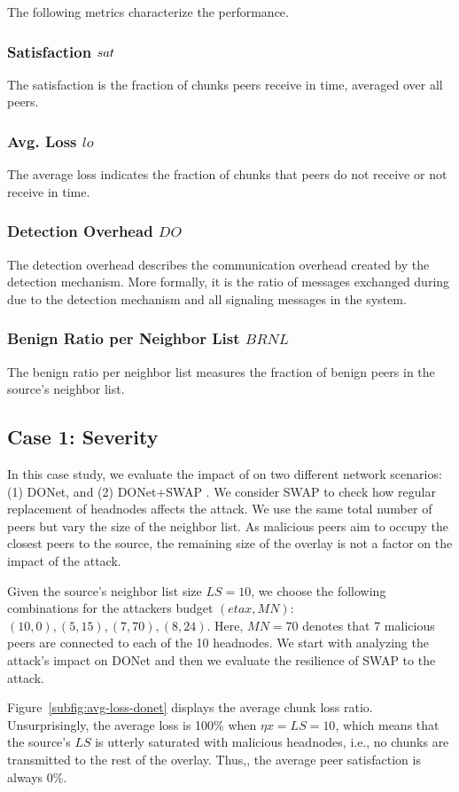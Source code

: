 The following metrics characterize the performance.
\subsubsection*{Satisfaction $sat$} The satisfaction is the fraction of chunks peers receive in time, averaged over all peers. 
\subsubsection*{Avg. Loss $lo$} The average loss indicates the fraction of chunks that peers do not receive or not receive in time. 
\subsubsection*{Detection Overhead $DO$} The detection overhead describes the communication overhead created by the detection mechanism. More formally, it is the ratio of messages exchanged during due to the detection mechanism and all signaling messages in the system.
\subsubsection*{Benign Ratio per Neighbor List $BRNL$} The benign ratio per neighbor list measures the fraction of benign peers in the source's neighbor list.

\subsection{Case 1: \drop Severity}

In this case study, we evaluate the impact of \drop on two different network scenarios:  (1) DONet, and (2) DONet+SWAP \cite{nguyen2016swap}. We consider SWAP to check how regular replacement of headnodes affects the attack. 
We use the same total number of peers but vary the size of the neighbor list.
As malicious peers aim to occupy the closest peers to the source, the remaining size of the overlay is not a factor on the impact of the \drop attack.

Given the source's neighbor list size $LS=10$, we choose the following combinations for the attackers budget $(eta x, MN)$: $(10,0), (5,15), (7,70), (8,24)$.
Here, $MN=70$ denotes that 7 malicious peers are connected to each of the 10 headnodes.
We start with analyzing the attack's impact on DONet and then we evaluate the resilience of SWAP to the attack.

Figure~\ref{subfig:avg-loss-donet} displays the average chunk loss ratio.
Unsurprisingly, the average loss is 100\% when $\eta x= LS =10$, which means that the source's $LS$ is utterly saturated with malicious headnodes, i.e., no chunks are transmitted to the rest of the overlay.
Thus,, the average peer satisfaction is always 0\%. 

